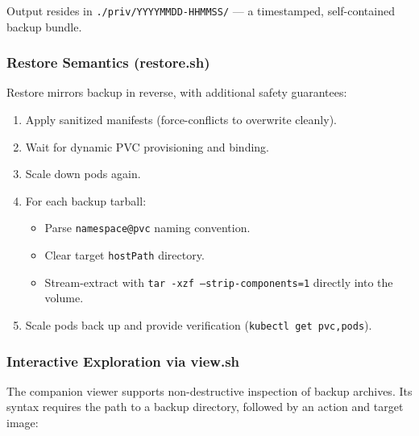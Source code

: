 \documentclass{article}
\begin{document}
Output resides in \texttt{./priv/YYYYMMDD-HHMMSS/} — a timestamped, self-contained backup bundle.

\subsubsection{Restore Semantics (restore.sh)}

Restore mirrors backup in reverse, with additional safety guarantees:

\begin{enumerate}
\item Apply sanitized manifests (force-conflicts to overwrite cleanly).
\item Wait for dynamic PVC provisioning and binding.
\item Scale down pods again.
\item For each backup tarball:
  \begin{itemize}
  \item Parse \texttt{namespace@pvc} naming convention.
  \item Clear target \texttt{hostPath} directory.
  \item Stream-extract with \texttt{tar -xzf --strip-components=1} directly into the volume.
  \end{itemize}
\item Scale pods back up and provide verification (\texttt{kubectl get pvc,pods}).
\end{enumerate}

\subsubsection{Interactive Exploration via view.sh}

The companion viewer supports non-destructive inspection of backup archives.
Its syntax requires the path to a backup directory, followed by an action and target image:
\end{document}
